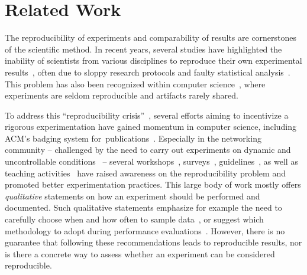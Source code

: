 
\pagebreak
\section{Related Work}
\label{sec:relWorks}

The reproducibility of experiments and comparability of results are cornerstones of the scientific method.
In recent years, several studies have highlighted the inability of scientists from various disciplines to reproduce their own experimental results~\cite{baker16reproducibility, peng15crisis}, often due to sloppy research protocols and faulty statistical analysis~\cite{boisvert2016Incentivizing, blackburn2016Truth, schmid2014measuring}.
This problem has also been recognized within computer science~\cite{collberg15reproducibility, vitek11systems}, where experiments are seldom reproducible and artifacts rarely shared.


To address this ``\mbox{reproducibility} crisis''~\cite{baker16reproducibility}, several efforts aiming to incentivize a rigorous experimentation have gained momentum in computer science, including \eg ACM's badging system \mbox{for publications}~\cite{acmBadges}.
Especially in the networking community -- challenged by the need to carry out experiments on dynamic and uncontrollable conditions~\cite{burchfield09rfjungle, matos18reproducible} -- several workshops~\cite{bajpai18dagstuhl_report, cpsbench18cpsweek, reproducibility17sigcomm}, surveys~\cite{flittner2018artifacts_survey}, guidelines~\cite{bajpai19dagstuhl_guide, saucez2018Thoughts, kritsis2018Tutorial, sevenwaystofail}, as well as teaching activities~\cite{yan17learning} have raised awareness on the reproducibility problem and promoted better experimentation practices.
This large body of work mostly offers \emph{qualitative} statements on how an experiment should be performed and documented.
Such qualitative statements emphasize for example the need to carefully choose when and how often to sample data~\cite{bajpai19dagstuhl_guide}, or suggest which methodology to adopt during performance evaluations~\cite{kritsis2018Tutorial}.
However, there is no guarantee that following these recommendations leads to reproducible results, nor is there a concrete way to assess whether an experiment can be considered reproducible.

